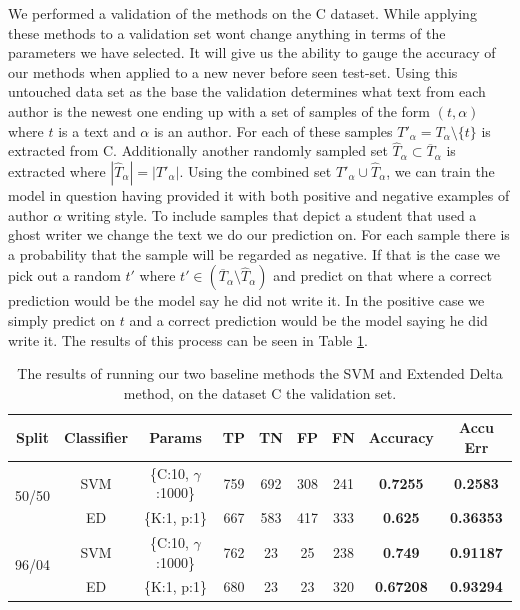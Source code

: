 We performed a validation of the methods on the \gls{C} dataset. While
applying these methods to a validation set wont change anything in terms of
the parameters we have selected. It will give us the ability to gauge the
accuracy of our methods when applied to a new never before seen test-set.
Using this untouched data set as the base the validation determines what text
from each author is the newest one ending up with a set of samples of the
form $(t, \alpha)$ where $t$ is a text and $\alpha$ is an author. For each
of these samples $T'_\alpha = T_\alpha \setminus \{t\}$ is extracted from
\gls{C}. Additionally another randomly sampled set $\hat{T}_\alpha \subset
\overline{T}_\alpha$ is extracted where $|\hat{T}_\alpha| = |T'_\alpha|$. Using
the combined set $T'_\alpha \cup \hat{T}_\alpha$, we can train the model in
question having provided it with both positive and negative examples of author
$\alpha$ writing style. To include samples that depict a student that used a
ghost writer we change the text we do our prediction on. For each sample there
is a probability that the sample will be regarded as negative. If that is the
case we pick out a random $t'$ where $t' \in (\overline{T}_\alpha \setminus
\hat{T}_\alpha)$ and predict on that where a correct prediction would be the
model say he did not write it. In the positive case we simply predict on $t$ and
a correct prediction would be the model saying he did write it. The results of
this process can be seen in Table \ref{tab:baseline-val-res}.

\begin{table}[h]
    \centering
    \begin{tabular}{|c|c|c|c|c|c|c||c|c|}
        \hline
        Split & Classifier & Params & TP & TN & FP & FN & \textbf{Accuracy} & \textbf{Accu Err} \\ \hline
        \multirow{2}{*}{50/50} & SVM & \{C:10, $\gamma$:1000\} &  759 & 692 & 308 & 241 & \textbf{0.7255} & \textbf{0.2583} \\ \cline{2-9} 
        & ED & \{K:1, p:1\} & 667 & 583 & 417 & 333 & \textbf{0.625} & \textbf{0.36353} \\ \hline
        \multirow{2}{*}{96/04} & SVM & \{C:10, $\gamma$:1000\} & 762 & 23 & 25 & 238 & \textbf{0.749} & \textbf{0.91187} \\ \cline{2-9} 
        & ED & \{K:1, p:1\} & 680 & 23 & 23 & 320 & \textbf{0.67208} & \textbf{0.93294} \\ \hline
    \end{tabular}
    \caption{The results of running our two baseline methods the \gls{SVM} and
        Extended Delta method, on the dataset \gls{C} the validation set.}
    \label{tab:baseline-val-res}
\end{table}


